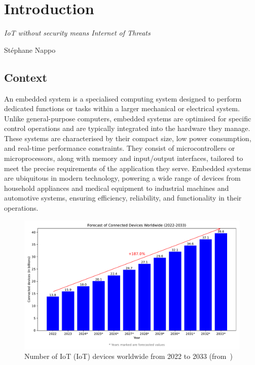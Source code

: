 \chapter{Introduction}
\label{chapter:introduction}

\epigraph{\textit{IoT without security means Internet of Threats}}{Stéphane Nappo}

\minitoc

\section{Context}
An embedded system is a specialised computing system designed to perform dedicated functions or tasks within a larger mechanical or electrical system. Unlike general-purpose computers, embedded systems are optimised for specific control operations and are typically integrated into the hardware they manage. These systems are characterised by their compact size, low power consumption, and real-time performance constraints. They consist of microcontrollers or microprocessors, along with memory and input/output interfaces, tailored to meet the precise requirements of the application they serve. Embedded systems are ubiquitous in modern technology, powering a wide range of devices from household appliances and medical equipment to industrial machines and automotive systems, ensuring efficiency, reliability, and functionality in their operations.

\begin{figure}[ht]
    \centering
    \includegraphics[width=\textwidth]{c1_intro/img/iot_forecasts.pdf}
    \caption{Number of IoT (IoT) devices worldwide from 2022 to 2033 (from~\cite{statista_iot})}
    \label{fig:iot_forecasts}
\end{figure}

